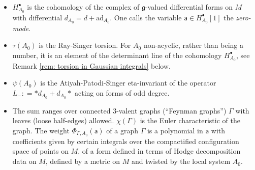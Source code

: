 \documentclass[11pt,a4paper]{amsart}
\theoremstyle{plain} %
\theoremstyle{definition}
\theoremstyle{remark}
\newcommand{\g}{\mathfrak{g}}
\newcommand{\mr}{\mathrm}
\newcommand{\sfa}{\mathsf{a}}
\newcommand{\bt}{\bullet}
\newcommand{\ra}{\rightarrow}
\begin{document}
\begin{itemize}
\item $H_{A_0}^\bt$ is the cohomology of the complex of $\g$-valued differential forms on $M$ with differential $d_{A_0}=d+\mr{ad}_{A_0}$. One calls the variable $\sfa\in H_{A_0}^\bt[1]$ the \emph{zero-mode}.
\item $\tau(A_0)$ is the Ray-Singer torsion. For $A_0$ non-acyclic, rather than being a number, it is an element of the determinant line of the cohomology $H^\bt_{A_0}$, see Remark \ref{rem: torsion in Gaussian integrals} below.
\item $\psi(A_0)$ is the Atiyah-Patodi-Singer eta-invariant of the %
    operator \\${L_-\colon=*d_{A_0}+d_{A_0}*}$ acting on forms of odd degree.
\item The sum ranges over connected 3-valent graphs (``Feynman graphs'') $\Gamma$ with leaves (loose half-edges) allowed. $\chi(\Gamma)$ is the Euler characteristic of the graph. %
The weight $\Phi_{\Gamma,A_0}(\sfa)$ of a graph $\Gamma$ is a polynomial in $\sfa$ with coefficients given by certain integrals over the compactified configuration space of points on $M$, of a form defined in terms of Hodge decomposition data on $M$, defined by a metric on $M$ and twisted by the local system $A_0$.
\begin{comment}
defined as 
    \begin{multline}\label{intro: Phi_Gamma}
        \Phi_{\Gamma,A_0}(a)=\\
        \int_{\overline{\mr{Conf}}_V(M)} 
        \left\langle  \prod_{\mr{leaves}\; l} \pi^*_{v(l)}{\red i}_{A_0}(a) \prod_{\mr{edges}\, e=(uv)} \pi_{uv}^*\eta_{A_0}
        \prod_{\mr{short\; loops}\; e=(vv)} \pi_v^* \eta_{A_0}^\Delta
        , \bigotimes_{\mr{vertices}} f \right\rangle,
    \end{multline}
    where: 
    \begin{itemize}
   \item  $\overline{\mr{Conf}}_V(M)$ is the Fulton-MacPherson-Axelrod-Singer compactification of the configuration space of $V=\#\{\mr{vertices}\}$ points on $M$. 
   \item $\pi_{uv}\colon \overline{\mr{Conf}}_V(M) \ra \overline{\mr{Conf}}_2(M)$   is the map forgetting the positions of all points except points $u$ and $v$; similarly,

\end{comment}
\end{itemize}
\end{document}
